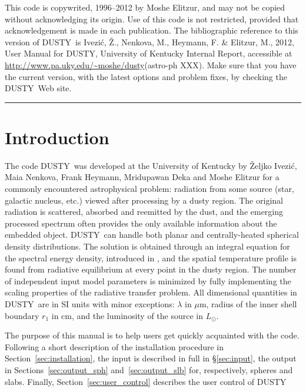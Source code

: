 \documentclass[11pt]{article}
\def\D    {{\sf DUSTY}}
\def\mic    {\hbox{$\mu$m}}
\def\Lo     {\hbox{$L_{\odot}$}}
\def\Ivezic {Ivezi\'c}
\begin{document}
\newpage

\thispagestyle{empty}

This code is copywrited, 1996--2012 by Moshe Elitzur, and may not be
copied without acknowledging its origin. Use of this code is not
restricted, provided that acknowledgement is made in each publication.
The bibliographic reference to this version of \D\ is \Ivezic, \v Z.,
Nenkova, M., Heymann, F. \& Elitzur, M., 2012, User Manual for \D,
University of Kentucky Internal Report, accessible at
\url{http://www.pa.uky.edu/~moshe/dusty}(astro-ph XXX). Make sure that
you have the current version, with the latest options and problem
fixes, by checking the \D\ Web site.

\newpage

 \setcounter{page}{1}

{\large\tableofcontents}

\bigskip \bigskip \hrule \bigskip \bigskip


\section{Introduction}
\label{sec:Introduction}

The code \D\ was developed at the University of Kentucky by \v Zeljko
\Ivezic, Maia Nenkova, Frank Heymann, Mridupawan Deka and Moshe
Elitzur for a commonly encountered astrophysical problem: radiation
from some source (star, galactic nucleus, etc.) viewed after
processing by a dusty region. The original radiation is scattered,
absorbed and reemitted by the dust, and the emerging processed
spectrum often provides the only available information about the
embedded object. \D\ can handle both planar and centrally-heated
spherical density distributions.  The solution is obtained through an
integral equation for the spectral energy density, introduced in
\cite{IE97}, and the spatial temperature profile is found from
radiative equilibrium at every point in the dusty region. The number
of independent input model parameters is minimized by fully
implementing the scaling properties of the radiative transfer problem.
All dimensional quantities in \D\ are in SI units with minor
exceptions: $\lambda$ in \mic, radius of the inner shell boundary
$r_1$ in cm, and the luminosity of the source in \Lo.

The purpose of this manual is to help users get quickly acquainted
with the code. Following a short description of the installation
procedure in Section~\ref{sec:installation}, the input is described in
full in \S\ref{sec:input}, the output in Sections~\ref{sec:output_sph}
and~\ref{sec:output_slb} for, respectively, spheres and
slabs. Finally, Section~\ref{sec:user_control} describes the user
control of \D
\end{document}
